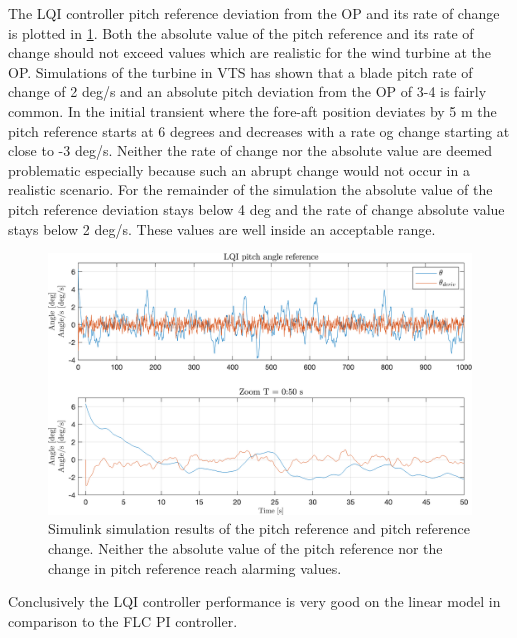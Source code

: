 The LQI controller pitch reference deviation from the OP and its rate of change is plotted in \cref{fig:app_sim_10_pitch}. Both the absolute value of the pitch reference and its rate of change should not exceed values which are realistic for the wind turbine at the OP. Simulations of the turbine in VTS has shown that a blade pitch rate of change of 2 deg/s and an absolute pitch deviation from the OP of 3-4 is fairly common. In the initial transient where the fore-aft position deviates by 5 m the pitch reference starts at 6 degrees and decreases with a rate og change starting at close to -3 deg/s. Neither the rate of change nor the absolute value are deemed problematic especially because such an abrupt change would not occur in a realistic scenario. For the remainder of the simulation the absolute value of the pitch reference deviation stays below 4 deg and the rate of change absolute value stays below 2 deg/s. These values are well inside an acceptable range.
\begin{figure}[ht]
	\centering
	\includegraphics[width=0.7\linewidth]{Graphics/TestResults/linearModPerf/sim_10_pitch.png}
	\caption{Simulink simulation results of the pitch reference and pitch reference change. Neither the absolute value of the pitch reference nor the change in pitch reference reach alarming values.}
	\label{fig:app_sim_10_pitch}
\end{figure}

Conclusively the LQI controller performance is very good on the linear model in comparison to the FLC PI controller.%


%
%


